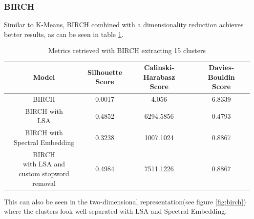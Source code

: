 \subsubsection{BIRCH}
Similar to K-Means, BIRCH combined with a dimensionality reduction achieves better results, as can be seen in table \ref{tab:scores_birch}.
\begin{table}[]
    \centering
    \begin{tabular}{c|c|c|c}
     Model &  \shortstack[c]{Silhouette \\ Score} & \shortstack[c]{Calinski-Harabasz \\ Score} &  \shortstack[c]{Davies-Bouldin \\ Score}  \\
     \hline
     \hline
     BIRCH & 0.0017 & 4.056 & 6.8339 \\
     \hline
     \shortstack[c]{BIRCH with \\ LSA} & 0.4852 & 6294.5856 & 0.4793
 \\
     \hline
     \shortstack[c]{BIRCH with \\ Spectral Embedding} & 0.3238 & 1007.1024 & 0.8867 \\
     \hline
     \shortstack[c]{BIRCH \\ with LSA and \\ custom stopword removal} & 0.4984 & 7511.1226 & 0.8867 \\

    \end{tabular}
    \caption{Metrics retrieved with BIRCH extracting 15 clusters}
    \label{tab:scores_birch}
\end{table}
This can also be seen in the two-dimensional representation(see figure \ref{fig:birch}) where the clusters look well separated with LSA and Spectral Embedding.
